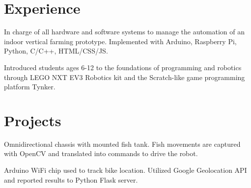\documentclass[]{deedy-resume-openfont}
\begin{document}
\begin{minipage}[t]{0.66\textwidth} 


\section{Experience}
\vspace{\topsep} %
\begin{tightemize}
\item In charge of all hardware and software systems to manage the
automation of an indoor vertical farming prototype. Implemented
with Arduino, Raspberry Pi, Python, C/C++, HTML/CSS/JS.
\end{tightemize}
\sectionsep

\begin{tightemize}
\item Introduced students ages 6-12 to the foundations of programming
and robotics through LEGO NXT EV3 Robotics kit and the Scratch-like
game programming platform Tynker.
\end{tightemize}
\sectionsep


\section{Projects}
\begin{tightemize}
\item Omnidirectional chassis with mounted fish tank. Fish movements are
captured with OpenCV and translated into commands to drive the robot.
\end{tightemize}
\sectionsep

\begin{tightemize}
\item Arduino WiFi chip used to track bike location. Utilized Google Geolocation API and reported results to Python Flask server.
\end{tightemize}
\sectionsep


\end{minipage}
\end{document}

